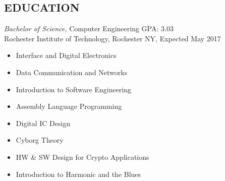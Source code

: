\documentclass[line,margin]{res}
\begin{document}
\begin{resume}
\section{EDUCATION} {\sl Bachelor of Science,} Computer Engineering GPA: 3.03\\
                Rochester Institute of Technology, Rochester NY, 
				Expected May 2017 %
				\begin{multicols}{2}
					\begin{itemize}
						\itemsep -2pt
						\item[] Interface and Digital Electronics
						\item[] Data Communication and Networks
						\item[] Introduction to Software Engineering
						\item[] Assembly Language Programming
						\item[] Digital IC Design
						\item[] Cyborg Theory
						\item[] HW \& SW Design for Crypto Applications
						\item[] Introduction to Harmonic and the Blues


						
					\end{itemize}
				\end{multicols}
 

\end{resume}
\end{document}

